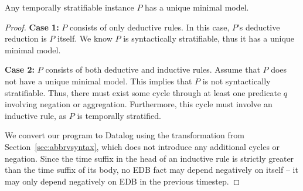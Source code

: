 \begin{lemma}
%
Any temporally stratifiable \slang instance $P$ has a unique minimal model.
%
\end{lemma} 

\begin{proof}
%
{\bf Case 1:} $P$ consists of only deductive rules.  In this case, $P$'s
deductive reduction is $P$ itself.  We know $P$ is syntactically stratifiable,
thus it has a unique minimal model.

{\bf Case 2:} $P$ consists of both deductive and inductive rules.
Assume that $P$ does not have a unique minimal model.  This implies that $P$ is
not syntactically stratifiable.  Thus, there must exist some cycle through at
least one predicate $q$ involving negation or aggregation.  Furthermore, this
cycle must involve an inductive rule, as $P$ is temporally stratified.

We convert our \slang program to Datalog using the transformation from
Section~\ref{sec:abbrvsyntax}, which does not introduce any additional cycles
or negation.  Since the time suffix in the head of an inductive rule is
strictly greater than the time suffix of its body, no EDB fact may depend
negatively on itself -- it may only depend negatively on EDB in the previous
timestep.

%
\end{proof}



